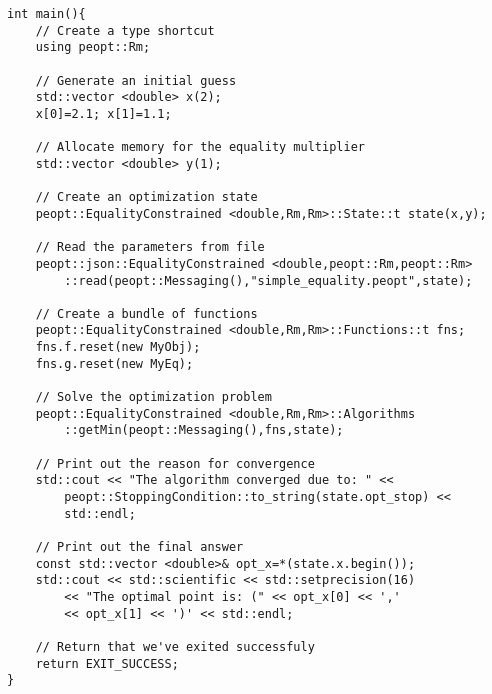 \begin{lstlisting}
int main(){
    // Create a type shortcut
    using peopt::Rm;

    // Generate an initial guess
    std::vector <double> x(2);
    x[0]=2.1; x[1]=1.1;

    // Allocate memory for the equality multiplier
    std::vector <double> y(1);
    
    // Create an optimization state
    peopt::EqualityConstrained <double,Rm,Rm>::State::t state(x,y);
    
    // Read the parameters from file 
    peopt::json::EqualityConstrained <double,peopt::Rm,peopt::Rm>
        ::read(peopt::Messaging(),"simple_equality.peopt",state);
    
    // Create a bundle of functions
    peopt::EqualityConstrained <double,Rm,Rm>::Functions::t fns;
    fns.f.reset(new MyObj);
    fns.g.reset(new MyEq);
    
    // Solve the optimization problem
    peopt::EqualityConstrained <double,Rm,Rm>::Algorithms
        ::getMin(peopt::Messaging(),fns,state);
    
    // Print out the reason for convergence
    std::cout << "The algorithm converged due to: " <<
        peopt::StoppingCondition::to_string(state.opt_stop) <<
        std::endl;
    
    // Print out the final answer
    const std::vector <double>& opt_x=*(state.x.begin());
    std::cout << std::scientific << std::setprecision(16)
        << "The optimal point is: (" << opt_x[0] << ','
        << opt_x[1] << ')' << std::endl;
    
    // Return that we've exited successfuly
    return EXIT_SUCCESS;
}
\end{lstlisting}
